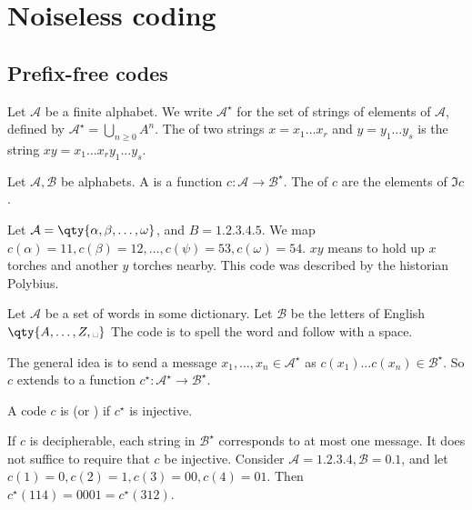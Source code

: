 \section{Noiseless coding}
\subsection{Prefix-free codes}
Let $\mathcal A$ be a finite alphabet.
We write $\mathcal A^\star$ for the set of strings of elements of $\mathcal A$, defined by $\mathcal A^\star = \bigcup_{n \geq 0} A^n$.
The  of two strings $x = x_1 \dots x_r$ and $y = y_1 \dots y_s$ is the string $xy = x_1 \dots x_r y_1 \dots y_s$.
\begin{definition}
    Let $\mathcal A, \mathcal B$ be alphabets.
    A  is a function $c \colon \mathcal A \to \mathcal B^\star$.
    The  of $c$ are the elements of $\Im c$.
\end{definition}
\begin{example}
    Let $\mathcal A = \qty{\alpha, \beta, \dots, \omega}$, and $B = \qty{1, 2, 3, 4, 5}$.
    We map $c(\alpha) = 11, c(\beta) = 12, \dots, c(\psi) = 53, c(\omega) = 54$.
    $xy$ means to hold up $x$ torches and another $y$ torches nearby.
    This code was described by the historian Polybius.
\end{example}
\begin{example}
    Let $\mathcal A$ be a set of words in some dictionary.
    Let $\mathcal B$ be the letters of English $\qty{A, \dots, Z, \text{\textvisiblespace}}$
    The code is to spell the word and follow with a space.
\end{example}
The general idea is to send a message $x_1, \dots, x_n \in \mathcal A^\star$ as $c(x_1) \dots c(x_n) \in \mathcal B^\star$.
So $c$ extends to a function $c^\star \colon \mathcal A^\star \to \mathcal B^\star$.
\begin{definition}
    A code $c$ is  (or ) if $c^\star$ is injective.
\end{definition}
If $c$ is decipherable, each string in $\mathcal B^\star$ corresponds to at most one message.
It does not suffice to require that $c$ be injective.
Consider $\mathcal A = \qty{1, 2, 3, 4}, \mathcal B = \qty{0,1}$, and let $c(1) = 0, c(2) = 1, c(3) = 00, c(4) = 01$.
Then $c^\star(114) = 0001 = c^\star(312)$.

